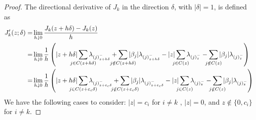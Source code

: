 \begin{proof}
  The directional derivative of \(J_k\) in the direction \(\delta\), with
  \(|\delta| = 1\), is defined as
  \begin{align}
    J_k'(z; \delta)
    = & \lim_{h \downarrow 0} \frac{J_k(z + h \delta) - J_k(z)}{h} \nonumber \\
    = &
    \lim_{h \downarrow 0} \frac{1}{h}
    \left(
      |z + h \delta| \smashoperator{\sum_{j \in C(z + h \delta)}} \lambda_{(j)^-_{z + h \delta}}
      + \smashoperator{\sum_{j \notin C(z + h\delta)}} |\beta_j| \lambda_{(j)^-_{z + h \delta}}
      - |z| \smashoperator{\sum_{j \in C(z)}} \lambda_{(j)^-_z}
      - \smashoperator{\sum_{j \notin C(z)}} |\beta_j| \lambda_{(j)^-_z}
    \right) \nonumber                                                        \\
    = & \lim_{h \downarrow 0}
    \frac{1}{h}
    \left(
      |z + h \delta| \smashoperator{\sum_{j \in C(z + {\varepsilon_c}\delta)}} \lambda_{(j)^-_{z + {\varepsilon_c}\delta}}
      + \smashoperator{\sum_{j \notin C(z + {\varepsilon_c}\delta)}} |\beta_j| \lambda_{(j)^-_{z + {\varepsilon_c}\delta}}
      - |z| \smashoperator{\sum_{j \in C(z)}} \lambda_{(j)^-_{z}}
      - \smashoperator{\sum_{j \notin C(z)}} |\beta_j| \lambda_{(j)^-_{z}}
    \right)
    \label{eq:directional-derivative-sl1}
  \end{align}
  We have the following cases to consider: \(|z| = c_i\) for \(i \neq k\)  ,
  \(|z| = 0\), and \(z \notin \{0, c_i\}\) for \(i \neq k\).


\end{proof}
